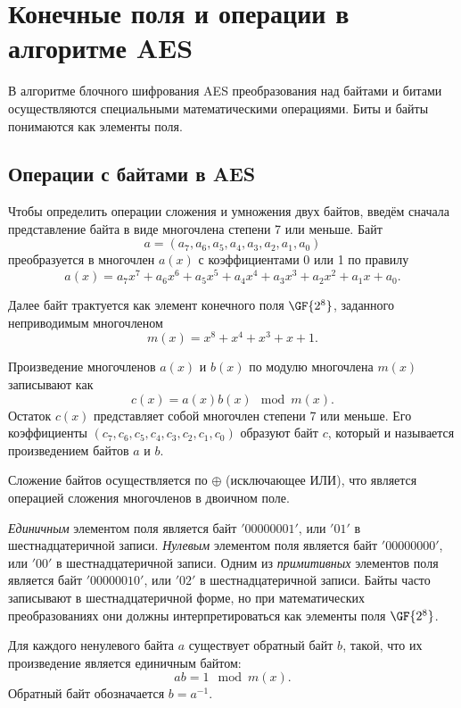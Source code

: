 \section{Конечные поля и операции в алгоритме AES}

В алгоритме блочного шифрования AES преобразования над байтами и битами осуществляются специальными математическими операциями. Биты и байты понимаются как элементы поля.

\subsection{Операции с байтами в AES}

Чтобы определить операции сложения и умножения двух байтов, введём сначала представление байта в виде многочлена степени 7 или меньше. Байт
    \[ a =( a_7, a_6, a_5, a_4, a_3, a_2, a_1, a_0) \]
преобразуется в многочлен $a(x)$ с коэффициентами 0 или 1 по правилу
    \[ a(x) = a_{7}x^{7}+a_{6}x^{6}+a_{5}x^{5}+a_{4}x^{4}+a_{3}x^{3}+a_{2}x^{2}+a_{1}x+a_{0}. \]

Далее байт трактуется как элемент конечного поля $\GF{2^8}$, заданного неприводимым многочленом
    \[ m(x) = x^{8}+x^{4}+x^{3}+x +1. \]

Произведение многочленов $a(x)$ и $b(x)$ по модулю многочлена $m(x)$ записывают как
    \[ c(x) = a(x) b(x) \mod m(x). \]
Остаток $c(x)$ представляет собой многочлен степени 7 или меньше. Его коэффициенты $(c_{7}, c_{6}, c_{5}, c_{4}, c_{3}, c_{2}, c_{1}, c_{0})$ образуют байт $c$, который и называется произведением байтов $a$ и $b$.

Сложение байтов осуществляется по $\oplus$ (исключающее ИЛИ), что является операцией сложения многочленов в двоичном поле.

\emph{Единичным} элементом поля является байт $\mathrm{'00000001'}$, или $\mathrm{'01'}$ в шестнадцатеричной записи. \emph{Нулевым} элементом поля является байт $\mathrm{'00000000'}$, или $\mathrm{'00'}$ в шестнадцатеричной записи. Одним из \emph{примитивных} элементов поля является байт $\mathrm{'00000010'}$, или $\mathrm{'02'}$ в шестнадцатеричной записи. Байты часто записывают в шестнадцатеричной форме, но при математических преобразованиях они должны интерпретироваться как элементы поля $\GF{2^8}$.

Для каждого ненулевого байта $a$ существует обратный байт $b$, такой, что их произведение является единичным байтом:
    \[ a b = 1 \mod m(x). \]
Обратный байт обозначается $b = a^{-1}$.

